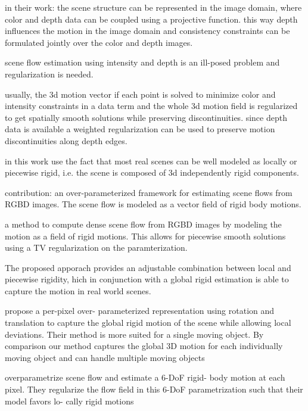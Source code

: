in their work: the scene structure can be represented in the image domain, where color and depth data can be coupled using a projective function. this way depth influences the motion in the image domain and consistency constraints can be formulated jointly over the color and depth images.

scene flow estimation using intensity and depth is an ill-posed problem and regularization is needed.

usually, the 3d motion vector if each point is solved to minimize color and intensity constraints in a data term and the whole 3d motion field is regularized to get spatially smooth solutions while preserving discontinuities. since depth data is available a weighted regularization can be used to preserve motion discontinuities along depth edges. 

in this work use the fact that most real scenes can be well modeled as locally or piecewise rigid, i.e. the scene is composed of 3d independently rigid components. 

contribution: an over-parameterized framework for estimating scene flows from RGBD images. The scene flow is modeled as a vector field of rigid body motions. 

a method to compute dense scene flow from RGBD images by modeling the motion as a field of rigid motions. This allows for piecewise smooth solutions using a TV regularization on the paramterization. 

The proposed apporach provides an adjustable combination between local and piecewise rigidity, hich in conjunction with a global rigid estimation is able to capture the motion in real world scenes.

propose    a    per-pixel    over-
parameterized representation using rotation and translation
to  capture  the  global  rigid  motion  of  the  scene  while
allowing  local  deviations.    Their  method  is  more  suited
for  a  single  moving  object.   By  comparison  our  method
captures the global 3D motion for each individually moving
object  and  can  handle  multiple  moving  objects

overparametrize scene flow and estimate a 6-DoF rigid- body motion at each pixel. They regularize the flow field in this 6-DoF parametrization such that their model favors lo- cally rigid motions

